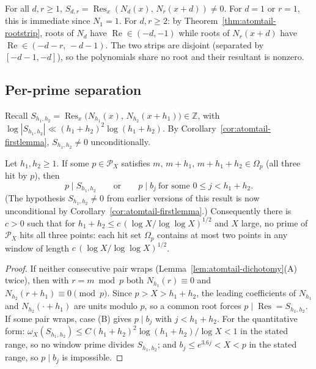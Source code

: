 \begin{corollary}
\label{cor:atomtail-firstlemma}
For all $d, r \ge 1$,
$S_{d,r} = \operatorname{Res}_x(N_d(x),\, N_r(x{+}d)) \ne 0$.
For $d = 1$ or $r = 1$, this is immediate since $N_1 = 1$.
For $d, r \ge 2$: by Theorem~\ref{thm:atomtail-rootstrip},
roots of $N_d$ have $\operatorname{Re} \in (-d, -1)$
while roots of $N_r(x{+}d)$
have $\operatorname{Re} \in (-d{-}r,\, -d{-}1)$.
The two strips are disjoint (separated by $[-d{-}1, -d]$),
so the polynomials share no root and their resultant is nonzero.
\end{corollary}

\subsection{Per-prime separation}

Recall $S_{h_1,h_2}=\operatorname{Res}_x\bigl(N_{h_1}(x),\,
N_{h_2}(x+h_1)\bigr)\in\mathbb Z$, with
$\log|S_{h_1,h_2}|\ll(h_1+h_2)^2\log(h_1+h_2)$.
By Corollary~\ref{cor:atomtail-firstlemma},
$S_{h_1,h_2} \ne 0$ unconditionally.

\begin{theorem}\label{thm:atomtail-sep}
Let $h_1,h_2\ge1$.  If some
$p\in\mathcal P_X$ satisfies
$m,\,m+h_1,\,m+h_1+h_2\in\Omega_p$ (all three hit by $p$), then
\[
 p\mid S_{h_1,h_2}
 \qquad\text{or}\qquad
 p\mid b_j\ \text{for some }0\le j<h_1+h_2 .
\]
(The hypothesis $S_{h_1,h_2}\ne0$ from earlier versions of this
result is now unconditional by
Corollary~\ref{cor:atomtail-firstlemma}.)
Consequently there is $c>0$ such that for
$h_1+h_2\le c\,(\log X/\log\log X)^{1/2}$ and $X$ large, no
prime of $\mathcal P_X$ hits all three points:  each hit set
$\Omega_p$ contains at most two points in any window of length
$c\,(\log X/\log\log X)^{1/2}$.
\end{theorem}

\begin{proof}
If neither consecutive pair wraps
(Lemma~\ref{lem:atomtail-dichotomy}(A) twice), then with
$r=m\bmod p$ both $N_{h_1}(r)\equiv0$ and
$N_{h_2}(r+h_1)\equiv0\pmod p$.  Since $p>X>h_1+h_2$, the
leading coefficients of $N_{h_1}$ and $N_{h_2}(\cdot+h_1)$ are
units modulo $p$, so a common root forces
$p\mid\operatorname{Res}=S_{h_1,h_2}$.  If some pair wraps, case
(B) gives $p\mid b_j$ with $j<h_1+h_2$.  For the quantitative
form: $\omega_X(S_{h_1,h_2})\le
C(h_1+h_2)^2\log(h_1+h_2)/\log X<1$ in the stated range, so no
window prime divides $S_{h_1,h_2}$; and $b_j\le
e^{3.6j}<X<p$ in the stated range, so $p\mid b_j$ is impossible.
\end{proof}


